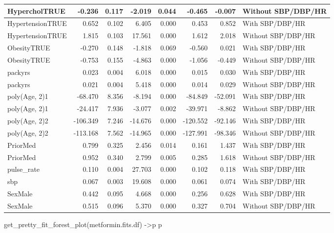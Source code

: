 \documentclass[
]{article}
\newenvironment{Shaded}{\begin{snugshade}}{\end{snugshade}}
\newcommand{\FunctionTok}[1]{\textcolor[rgb]{0.00,0.00,0.00}{#1}}
\newcommand{\NormalTok}[1]{#1}
\newcommand{\OtherTok}[1]{\textcolor[rgb]{0.56,0.35,0.01}{#1}}
\begin{document}
\begin{table}
\begin{tabular}[t]{l|r|r|r|r|r|r|l}
\hline
HypercholTRUE & -0.236 & 0.117 & -2.019 & 0.044 & -0.465 & -0.007 & Without SBP/DBP/HR\\
\hline
HypertensionTRUE & 0.652 & 0.102 & 6.405 & 0.000 & 0.453 & 0.852 & With SBP/DBP/HR\\
\hline
HypertensionTRUE & 1.815 & 0.103 & 17.561 & 0.000 & 1.612 & 2.018 & Without SBP/DBP/HR\\
\hline
ObesityTRUE & -0.270 & 0.148 & -1.818 & 0.069 & -0.560 & 0.021 & With SBP/DBP/HR\\
\hline
ObesityTRUE & -0.753 & 0.155 & -4.863 & 0.000 & -1.056 & -0.449 & Without SBP/DBP/HR\\
\hline
packyrs & 0.023 & 0.004 & 6.018 & 0.000 & 0.015 & 0.030 & With SBP/DBP/HR\\
\hline
packyrs & 0.021 & 0.004 & 5.418 & 0.000 & 0.014 & 0.029 & Without SBP/DBP/HR\\
\hline
poly(Age, 2)1 & -68.470 & 8.356 & -8.194 & 0.000 & -84.849 & -52.091 & With SBP/DBP/HR\\
\hline
poly(Age, 2)1 & -24.417 & 7.936 & -3.077 & 0.002 & -39.971 & -8.862 & Without SBP/DBP/HR\\
\hline
poly(Age, 2)2 & -106.349 & 7.246 & -14.676 & 0.000 & -120.552 & -92.146 & With SBP/DBP/HR\\
\hline
poly(Age, 2)2 & -113.168 & 7.562 & -14.965 & 0.000 & -127.991 & -98.346 & Without SBP/DBP/HR\\
\hline
PriorMed & 0.799 & 0.325 & 2.456 & 0.014 & 0.161 & 1.437 & With SBP/DBP/HR\\
\hline
PriorMed & 0.952 & 0.340 & 2.799 & 0.005 & 0.285 & 1.618 & Without SBP/DBP/HR\\
\hline
pulse\_rate & 0.110 & 0.004 & 27.703 & 0.000 & 0.102 & 0.118 & With SBP/DBP/HR\\
\hline
sbp & 0.067 & 0.003 & 19.608 & 0.000 & 0.061 & 0.074 & With SBP/DBP/HR\\
\hline
SexMale & 0.442 & 0.095 & 4.668 & 0.000 & 0.256 & 0.628 & With SBP/DBP/HR\\
\hline
SexMale & 0.515 & 0.096 & 5.370 & 0.000 & 0.327 & 0.704 & Without SBP/DBP/HR\\
\hline
\end{tabular}
\end{table}

\begin{Shaded}
\begin{Highlighting}[]
\FunctionTok{get\_pretty\_fit\_forest\_plot}\NormalTok{(metformin.fits.df) }\OtherTok{{-}\textgreater{}}\NormalTok{p}
\NormalTok{p}
\end{Highlighting}
\end{Shaded}
\end{document}
